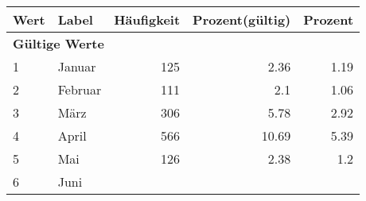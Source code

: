      \begin{longtable}{lXrrr}
     \toprule
     \textbf{Wert} & \textbf{Label} & \textbf{Häufigkeit} & \textbf{Prozent(gültig)} & \textbf{Prozent} \\
     \endhead
     \midrule
     \multicolumn{5}{l}{\textbf{Gültige Werte}}\\

     1 &
     \multicolumn{1}{X}{ Januar   } &


       \num{125} &
       \num[round-mode=places,round-precision=2]{2,36} &
         \num[round-mode=places,round-precision=2]{1,19} \\

     2 &
     \multicolumn{1}{X}{ Februar   } &


       \num{111} &
       \num[round-mode=places,round-precision=2]{2,1} &
         \num[round-mode=places,round-precision=2]{1,06} \\

     3 &
     \multicolumn{1}{X}{ März   } &


       \num{306} &
       \num[round-mode=places,round-precision=2]{5,78} &
         \num[round-mode=places,round-precision=2]{2,92} \\

     4 &
     \multicolumn{1}{X}{ April   } &


       \num{566} &
       \num[round-mode=places,round-precision=2]{10,69} &
         \num[round-mode=places,round-precision=2]{5,39} \\

     5 &
     \multicolumn{1}{X}{ Mai   } &


       \num{126} &
       \num[round-mode=places,round-precision=2]{2,38} &
         \num[round-mode=places,round-precision=2]{1,2} \\

     6 &
     \multicolumn{1}{X}{ Juni   } &



\end{longtable}
